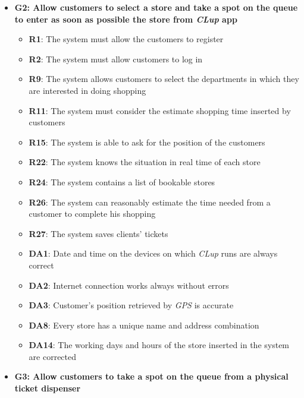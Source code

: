 \documentclass{article}
\begin{document}
\begin{itemize}
\begin{itemize}
					\end{itemize}
				
				\item {\bfseries G2: Allow customers to select a store and take a spot on the queue to enter as soon as possible the store from \emph{CLup} app}	

					\begin{itemize}
						
						\item {\bfseries R1}: The system must allow the customers to register
						\item {\bfseries R2}: The system must allow customers to log in
						\item {\bfseries R9}: The system allows customers to select the departments in which they are interested in doing shopping							\item {\bfseries R11}: The system must consider the estimate shopping time inserted by customers
						\item {\bfseries R15}: The system is able to ask for the position of the customers
						\item {\bfseries R22}: The system knows the situation in real time of each store
						\item {\bfseries R24}: The system contains a list of bookable stores
						\item {\bfseries R26}: The system can reasonably estimate the time needed from a customer to complete his shopping
						\item {\bfseries R27}: The system saves clients' tickets \\
		
						\item {\bfseries DA1}: Date and time on the devices on which \emph{CLup} runs are always correct
						\item {\bfseries DA2}: Internet connection works always without errors
						\item {\bfseries DA3}: Customer’s position retrieved by \emph{GPS} is accurate
						\item {\bfseries DA8}: Every store has a unique name and address combination
						\item {\bfseries DA14}: The working days and hours of the store inserted in the system are corrected
						
					\end{itemize}

				\item {\bfseries G3: Allow customers to take a spot on the queue from a physical ticket dispenser}	


\end{itemize}
\end{document}
